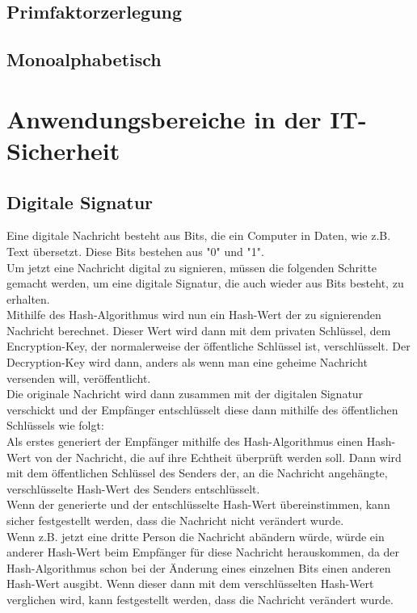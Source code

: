 \documentclass[14pt,a4paper]{scrartcl}
\begin{document}
	\subsection{Primfaktorzerlegung}
	\subsection{Monoalphabetisch}

\section{Anwendungsbereiche in der IT- Sicherheit}
	\subsection{Digitale Signatur}
	Eine digitale Nachricht besteht aus Bits, die ein Computer in Daten, wie z.B. Text übersetzt. Diese Bits bestehen aus "0" und "1". \\ 
	Um jetzt eine Nachricht digital zu signieren, müssen die folgenden Schritte gemacht werden, um eine digitale Signatur, die auch wieder aus Bits besteht, zu erhalten.\\
	Mithilfe des Hash-Algorithmus wird nun ein Hash-Wert der zu signierenden Nachricht berechnet. Dieser Wert wird dann mit dem privaten Schlüssel, dem Encryption-Key, der normalerweise der öffentliche Schlüssel ist, verschlüsselt. %
	Der Decryption-Key wird dann, anders als wenn man eine geheime Nachricht versenden will, veröffentlicht.\\
	Die originale Nachricht wird dann zusammen mit der digitalen Signatur verschickt und der Empfänger entschlüsselt diese dann mithilfe des öffentlichen Schlüssels wie folgt:\\
	Als erstes generiert der Empfänger mithilfe des Hash-Algorithmus einen Hash-Wert von der Nachricht, die auf ihre Echtheit überprüft werden soll. Dann wird mit dem öffentlichen Schlüssel des Senders der, an die Nachricht angehängte, verschlüsselte Hash-Wert des Senders entschlüsselt. \\
Wenn der generierte und der entschlüsselte Hash-Wert übereinstimmen, kann sicher festgestellt werden, dass die Nachricht nicht verändert wurde. \\
Wenn z.B. jetzt eine dritte Person die Nachricht abändern würde, würde ein anderer Hash-Wert beim Empfänger für diese Nachricht herauskommen, da der Hash-Algorithmus schon bei der Änderung eines einzelnen Bits einen anderen Hash-Wert ausgibt. Wenn dieser dann mit dem verschlüsselten Hash-Wert verglichen wird, kann festgestellt werden, dass die Nachricht verändert wurde.
	
\end{document}
